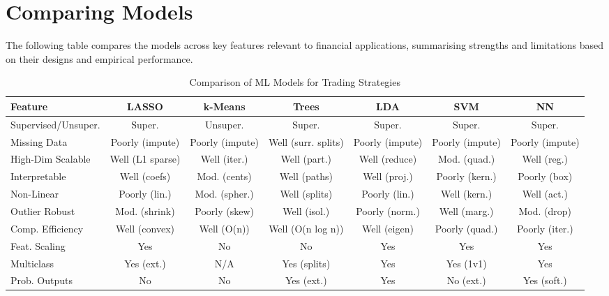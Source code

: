 \documentclass{article}
\begin{document}
\section{Comparing Models}

The following table compares the models across key features relevant to financial applications, summarising strengths and limitations based on their designs and empirical performance.

\begin{table}[h]
\centering
\footnotesize
\setlength{\tabcolsep}{1.5pt}
\begin{tabular}{l|cccccc}
\toprule
Feature & LASSO & k-Means & Trees & LDA & SVM & NN \\
\midrule
Supervised/Unsuper. & Super. & Unsuper. & Super. & Super. & Super. & Super. \\
Missing Data & Poorly (impute) & Poorly (impute) & Well (surr. splits) & Poorly (impute) & Poorly (impute) & Poorly (impute) \\
High-Dim Scalable & Well (L1 sparse) & Well (iter.) & Well (part.) & Well (reduce) & Mod. (quad.) & Well (reg.) \\
Interpretable & Well (coefs) & Mod. (cents) & Well (paths) & Well (proj.) & Poorly (kern.) & Poorly (box) \\
Non-Linear & Poorly (lin.) & Mod. (spher.) & Well (splits) & Poorly (lin.) & Well (kern.) & Well (act.) \\
Outlier Robust & Mod. (shrink) & Poorly (skew) & Well (isol.) & Poorly (norm.) & Well (marg.) & Mod. (drop) \\
Comp. Efficiency & Well (convex) & Well (O(n)) & Well (O(n log n)) & Well (eigen) & Poorly (quad.) & Poorly (iter.) \\
Feat. Scaling & Yes & No & No & Yes & Yes & Yes \\
Multiclass & Yes (ext.) & N/A & Yes (splits) & Yes & Yes (1v1) & Yes \\
Prob. Outputs & No & No & Yes (ext.) & Yes & No (ext.) & Yes (soft.) \\
\bottomrule
\end{tabular}
\caption{Comparison of ML Models for Trading Strategies}
\end{table}



\end{document}

